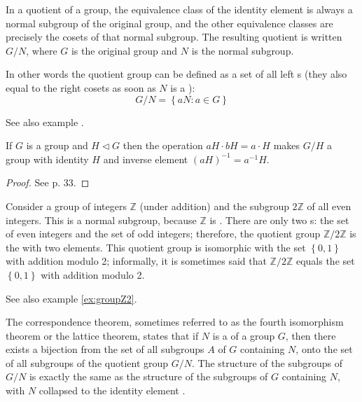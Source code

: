 \begin{appendices}
\begin{definition}
  In a quotient of a group, the equivalence class of the identity
  element is always a normal subgroup of the original group, and the
  other equivalence classes are precisely the cosets of that normal
  subgroup. The resulting quotient is written $G / N$, where $G$ is the
  original group and $N$ is the normal subgroup.

  In other words the quotient group can be defined as a set of all
  left s (they also equal to the right cosets as
  soon as $N$ is a ):
  \[
  G/N = \left\{a N: a \in G\right\}
  \]

  See also example .
  \label{def:quotientgroup}
\end{definition}

\begin{theorem}
  If $G$ is a group and $H \triangleleft G$ then the operation $aH
  \cdot bH = a \cdot H$ makes $G/H$ a group with identity $H$ and
  inverse element $\left(a H\right)^{-1} = a^{-1} H$.
  \begin{proof}
    See \cite{book:kostrikin} p. 33.
  \end{proof}
  \label{thm:quotientgroup}
\end{theorem}

\begin{example}
  Consider \cite{wiki:quotientgroup} a group of integers $\mathbb{Z}$
  (under addition) and the 
  subgroup $2\mathbb{Z}$ of all even integers. This is a normal
  subgroup, because $\mathbb{Z}$ is . There
  are only two s: the set 
  of even integers and the set of odd integers; therefore, the
  quotient group $\mathbb{Z}/2\mathbb{Z}$ is the
   with two 
  elements. This 
  quotient group is isomorphic with the set $\left\{ 0, 1 \right\}$
  with addition modulo 2; informally, it is sometimes said that
  $\mathbb{Z}/2\mathbb{Z}$
  equals the set $\left\{ 0, 1 \right\}$ with addition modulo 2.

  See also example \ref{ex:groupZ2}.
  \label{ex:quotientgroup}
\end{example}

\begin{theorem}
  The correspondence theorem, sometimes referred to as the fourth
  isomorphism theorem or the lattice theorem, states that if 
  $N$ is a  of a group  $G$, then there
  exists a bijection from the set of all subgroups $A$ of $G$
  containing $N$, onto the set of all subgroups of the quotient group
  $G/N$. The structure of the subgroups of $G/N$ is exactly the same
  as the structure of the subgroups of $G$ containing $N$, with 
  $N$ collapsed to the identity element \cite{wiki:correspondence}.
  \label{thm:correspondence}
\end{theorem}


\end{appendices}
